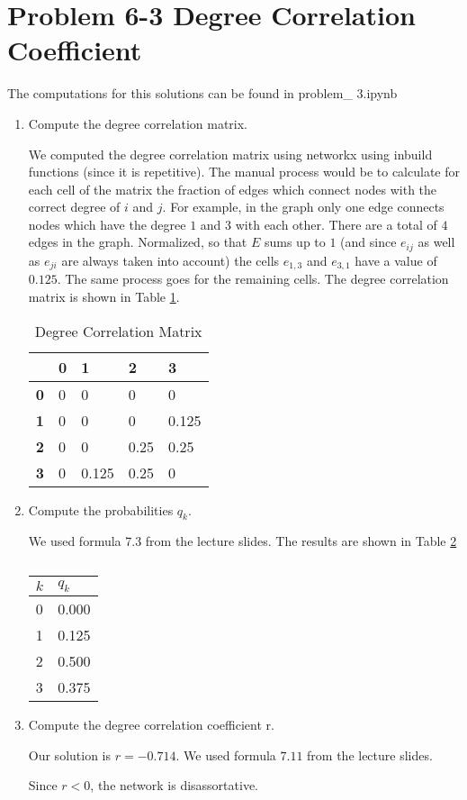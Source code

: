 \section{Problem 6-3 Degree Correlation Coefficient}
The computations for this solutions can be found in problem\_ 3.ipynb
\begin{enumerate}
	\item Compute the degree correlation matrix.
	
	We computed the degree correlation matrix using networkx using inbuild functions (since it is repetitive).  The manual process would be to calculate for each cell of the matrix the fraction of edges which connect nodes with the correct degree of $i$ and $j$.  For example,  in the graph only one edge connects nodes which have the degree $1$ and $3$ with each other.  There are a total of $4$ edges in the graph.  Normalized, so that $E$ sums up to $1$ (and since $e_{ij}$ as well as $e_{ji}$ are always taken into account) the cells $e_{1,3}$ and $e_{3,1}$ have a value of $0.125$. The same process goes for the remaining cells. The degree correlation matrix is shown in Table \ref{tab:deg_corr_mat}.
	
	\begin{table}[h]
	\centering
	\begin{tabular}{lllll}
		\hline
		\textbf{}  & \textbf{0} & \textbf{1} & \textbf{2} & \textbf{3} \\ \hline
		\textbf{0} & 0          & 0          & 0          & 0          \\ \hline
		\textbf{1} & 0          & 0          & 0          & 0.125      \\ \hline
		\textbf{2} & 0          & 0          & 0.25       & 0.25       \\ \hline
		\textbf{3} & 0          & 0.125      & 0.25       & 0          \\ \hline
	\end{tabular}
	\caption{Degree Correlation Matrix}
	\label{tab:deg_corr_mat}
	\end{table}
	
	\item Compute the probabilities $q_k$.
	
	We used formula 7.3 from the lecture slides.  The results are shown in Table \ref{tab:qk}
	
	\begin{table}[h]
	\centering
	\begin{tabular}{|l|l|}
		\hline
		\textbf{$k$} & \textbf{$q_k$} \\ \hline
		0          & 0.000         \\ \hline
		1          & 0.125         \\ \hline
		2          & 0.500         \\ \hline
		3          & 0.375         \\ \hline
	\end{tabular}
	\caption{}
	\label{tab:qk}
	\end{table}

  \item Compute the degree correlation coefficient r.
  
  Our solution is $r = -0.714$. We used formula $7.11$ from the lecture slides. 
  
  Since $r < 0$, the network is disassortative.
\end{enumerate}